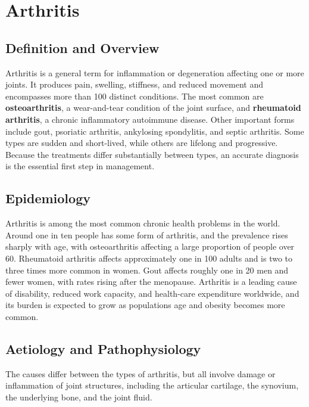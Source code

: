 \chapter{Arthritis}

\section*{Definition and Overview}
Arthritis is a general term for inflammation or degeneration affecting one or more joints. It produces pain, swelling, stiffness, and reduced movement and encompasses more than 100 distinct conditions. The most common are \textbf{osteoarthritis}, a wear-and-tear condition of the joint surface, and \textbf{rheumatoid arthritis}, a chronic inflammatory autoimmune disease. Other important forms include gout, psoriatic arthritis, ankylosing spondylitis, and septic arthritis. Some types are sudden and short-lived, while others are lifelong and progressive. Because the treatments differ substantially between types, an accurate diagnosis is the essential first step in management.

\section*{Epidemiology}
Arthritis is among the most common chronic health problems in the world. Around one in ten people has some form of arthritis, and the prevalence rises sharply with age, with osteoarthritis affecting a large proportion of people over 60. Rheumatoid arthritis affects approximately one in 100 adults and is two to three times more common in women. Gout affects roughly one in 20 men and fewer women, with rates rising after the menopause. Arthritis is a leading cause of disability, reduced work capacity, and health-care expenditure worldwide, and its burden is expected to grow as populations age and obesity becomes more common.

\section*{Aetiology and Pathophysiology}
The causes differ between the types of arthritis, but all involve damage or inflammation of joint structures, including the articular cartilage, the synovium, the underlying bone, and the joint fluid.

